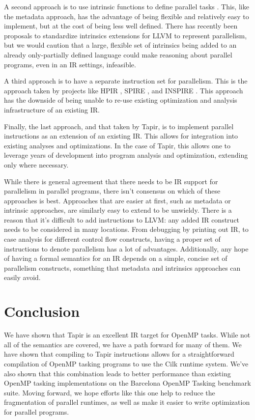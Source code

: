 \documentclass[sigconf]{acmart}
\begin{document}
A second approach is to use intrinsic functions to define parallel tasks
\cite{ares}. This, like the metadata approach, has the advantage of being
flexible and relatively easy to implement, but at the cost of being less well
defined. There has recently been proposals to standardize intrinsics extensions
for LLVM to represent parallelism, but we would caution that a large, flexible
set of intrinsics being added to an already only-partially defined
\cite{verillvm} language could make reasoning about parallel programs, even
in an IR settings, infeasible. 

A third approach is to have a separate instruction set for parallelism. This is
the approach taken by projects like HPIR \cite{zhao2011intermediate}, SPIRE
\cite{khaldi2012spire}, and INSPIRE \cite{jordan2013inspire}. This approach has
the downside of being unable to re-use existing optimization and analysis
infrastructure of an existing IR. 

Finally, the last approach, and that taken by Tapir, is to implement parallel 
instructions as an extension of an existing IR. This allows for integration
into existing analyses and optimizations. In the case of Tapir, this allows one
to leverage years of development into program analysis and optimization,
extending only where necessary. 

While there is general agreement that there needs to be IR support for
parallelism in parallel programs, there isn't consensus on which of these
approaches is best. Approaches that are easier at first, such as metadata
or intrinsic approaches, are similarly easy to extend to be unwieldy. There is
a reason that it's difficult to add instructions to LLVM: any added IR
construct needs to be considered in many locations. From debugging by printing
out IR, to case analysis for different control flow constructs, having 
a proper set of instructions to denote parallelism has a lot of advantages. 
Additionally, any hope of having a formal semantics for an IR depends on a 
simple, concise set of parallelism constructs, something that metadata and
intrinsics approaches can easily avoid. 

\section{Conclusion} \label{Sec:Conclusion}
We have shown that Tapir is an excellent IR target for OpenMP tasks. While not
all of the semantics are covered, we have a path forward for many of them. We have
shown that compiling to Tapir instructions allows for a straightforward compilation of 
OpenMP tasking programs to use the Cilk runtime system. We've also shown that this
combination leads to better performance than existing OpenMP tasking implementations
on the Barcelona OpenMP Tasking benchmark suite. Moving forward, we hope efforts like
this one help to reduce the fragmentation of parallel runtimes, as well as make
it easier to write optimization for parallel programs. 
\end{document}
